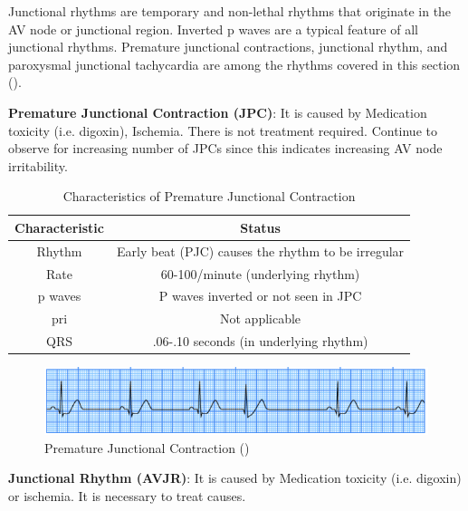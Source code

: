 Junctional rhythms are temporary and non-lethal rhythms that originate in the AV node or junctional region. Inverted p waves are a typical feature of all junctional rhythms. Premature junctional contractions, junctional rhythm, and paroxysmal junctional tachycardia are among the rhythms covered in this section (\cite{arryth_types}).


\textbf{Premature Junctional Contraction (JPC)}: It is caused by Medication toxicity (i.e. digoxin), Ischemia. There is not treatment required.
Continue to observe for increasing number of JPCs since this indicates
increasing AV node irritability.


\begin{table}[H]
\begin{center}
\begin{tabular}{||c || c||}
 \hline
\textbf{Characteristic} & \textbf{Status} \\ [0.4ex] 
 \hline\hline
 Rhythm & Early beat (PJC) causes the rhythm to be irregular \\
\hline
Rate & 60-100/minute (underlying rhythm)\\
\hline
p waves & P waves inverted or not seen in JPC \\
\hline
pri & Not applicable \\
\hline
QRS & .06-.10 seconds (in underlying rhythm) \\
\hline\hline
\end{tabular}
\end{center}
\caption{Characteristics of Premature Junctional Contraction}
\label{table:JPC_characteristics}
\end{table}

 \begin{figure}[H]
\centering
\includegraphics[scale=0.8]{img/JPC.png}
\caption{Premature Junctional Contraction (\cite{arryth_types})}
\label{fig:JPC}
\end{figure}


\textbf{Junctional Rhythm (AVJR)}: It is caused by Medication toxicity (i.e. digoxin) or ischemia. It is necessary to treat causes.


